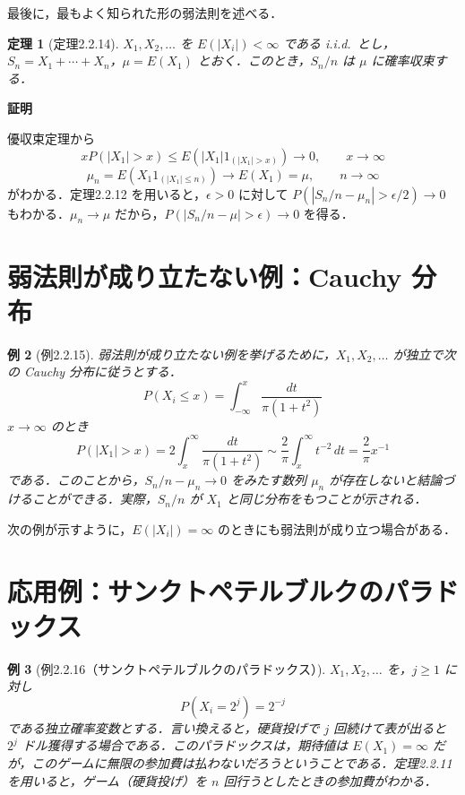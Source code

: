 \documentclass[dvipdfmx]{jsarticle}
\makeatletter
\numberwithin{equation}{section}
\theoremstyle{plain}
\newtheorem{thm}{定理}[section]
\newtheorem{ex}[thm]{例}
\renewenvironment{proof}[1][\proofname]{\par
  \pushQED{\qed}%
  \normalfont \topsep6\p@\@plus6\p@\relax
  \trivlist
  \item\relax
  {\bfseries
  #1\@addpunct{.}}\hspace\labelsep\ignorespaces
}{%
  \popQED\endtrivlist\@endpefalse
}
\renewcommand{\proofname}{証明}
\makeatother
\begin{document}
最後に，最もよく知られた形の弱法則を述べる．

\begin{thm}[定理2.2.14]
$X_1, X_2, \dots$ を $E(|X_i|) < \infty$ である i.i.d.\ とし，$S_n = X_1 + \cdots + X_n$，$\mu = E(X_1)$ とおく．このとき，$S_n/n$ は $\mu$ に確率収束する．
\end{thm}

\begin{proof}
優収束定理から
\[
  xP(|X_1| > x) \le E\!\left(|X_1| 1_{(|X_1|>x)}\right) \to 0, \qquad x \to \infty
\]
\[
  \mu_n = E\!\left(X_1 1_{(|X_1| \le n)}\right) \to E(X_1) = \mu, \qquad n \to \infty
\]
がわかる．定理2.2.12 を用いると，$\epsilon > 0$ に対して $P(|S_n/n - \mu_n| > \epsilon/2) \to 0$ もわかる．$\mu_n \to \mu$ だから，$P(|S_n/n - \mu| > \epsilon) \to 0$ を得る．
\end{proof}

\section{弱法則が成り立たない例：Cauchy 分布}

\begin{ex}[例2.2.15]
弱法則が成り立たない例を挙げるために，$X_1, X_2, \dots$ が独立で次の Cauchy 分布に従うとする．
\[
  P(X_i \le x) = \int_{-\infty}^x \frac{dt}{\pi(1+t^2)}
\]
$x \to \infty$ のとき
\[
  P(|X_1| > x) = 2\int_x^\infty \frac{dt}{\pi(1+t^2)} \sim \frac{2}{\pi}\int_x^\infty t^{-2}\, dt = \frac{2}{\pi} x^{-1}
\]
である．このことから，$S_n/n - \mu_n \to 0$ をみたす数列 $\mu_n$ が存在しないと結論づけることができる．実際，$S_n/n$ が $X_1$ と同じ分布をもつことが示される．
\end{ex}

次の例が示すように，$E(|X_i|) = \infty$ のときにも弱法則が成り立つ場合がある．

\section{応用例：サンクトペテルブルクのパラドックス}

\begin{ex}[例2.2.16（サンクトペテルブルクのパラドックス）]
$X_1, X_2, \dots$ を，$j \ge 1$ に対し
\[
  P(X_i = 2^j) = 2^{-j}
\]
である独立確率変数とする．言い換えると，硬貨投げで $j$ 回続けて表が出ると $2^j$ ドル獲得する場合である．このパラドックスは，期待値は $E(X_1) = \infty$ だが，このゲームに無限の参加費は払わないだろうということである．定理2.2.11 を用いると，ゲーム（硬貨投げ）を $n$ 回行うとしたときの参加費がわかる．
\end{ex}
\end{document}
